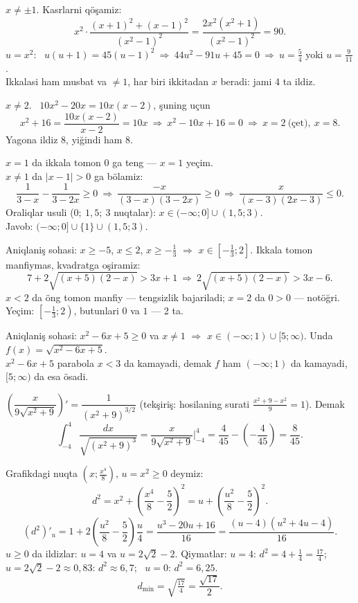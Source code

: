 $x\ne\pm1$. Kasrlarni qöşamiz:
\[x^2\cdot\frac{(x+1)^2+(x-1)^2}{(x^2-1)^2}=\frac{2x^2(x^2+1)}{(x^2-1)^2}=90.\]
$u=x^2$: \ $u(u+1)=45(u-1)^2\ \Rightarrow\ 44u^2-91u+45=0\ \Rightarrow\ u=\frac54$ yoki $u=\frac9{11}$.\\
Ikkalasi ham musbat va $\ne1$, har biri ikkitadan $x$ beradi: jami 4 ta ildiz.

$x\ne2$. \ $10x^2-20x=10x(x-2)$, şuning uçun
\[x^2+16=\frac{10x(x-2)}{x-2}=10x\ \Rightarrow\ x^2-10x+16=0\ \Rightarrow\ x=2\ \text{(çet)},\ x=8.\]
Yagona ildiz 8, yiğindi ham 8.

$x=1$ da ikkala tomon 0 ga teng — $x=1$ yeçim.\\
$x\ne1$ da $|x-1|>0$ ga bölamiz:
\[\frac1{3-x}-\frac1{3-2x}\ge0\ \Rightarrow\ \frac{-x}{(3-x)(3-2x)}\ge0\ \Rightarrow\ \frac{x}{(x-3)(2x-3)}\le0.\]
Oraliqlar usuli ($0;\ 1{,}5;\ 3$ nuqtalar): $x\in(-\infty;0]\cup(1{,}5;3)$.\\
Javob: $(-\infty;0]\cup\{1\}\cup(1{,}5;3)$.

Aniqlaniş sohasi: $x\ge-5$, $x\le2$, $x\ge-\frac13$ $\Rightarrow$ $x\in\left[-\frac13;2\right]$. Ikkala tomon manfiymas, kvadratga oşiramiz:
\[7+2\sqrt{(x+5)(2-x)}>3x+1\ \Rightarrow\ 2\sqrt{(x+5)(2-x)}>3x-6.\]
$x<2$ da öng tomon manfiy — tengsizlik bajariladi; $x=2$ da $0>0$ — notöğri.\\
Yeçim: $\left[-\frac13;2\right)$, butunlari $0$ va $1$ — 2 ta.

Aniqlaniş sohasi: $x^2-6x+5\ge0$ va $x\ne1$ $\Rightarrow$ $x\in(-\infty;1)\cup[5;\infty)$. Unda $f(x)=\sqrt{x^2-6x+5}$.\\
$x^2-6x+5$ parabola $x<3$ da kamayadi, demak $f$ ham $(-\infty;1)$ da kamayadi, $[5;\infty)$ da esa ösadi.

$\left(\dfrac{x}{9\sqrt{x^2+9}}\right)'=\dfrac{1}{(x^2+9)^{3/2}}$ (tekşiriş: hosilaning surati $\frac{x^2+9-x^2}{9}=1$). Demak
\[\int_{-4}^{4}\frac{dx}{\sqrt{(x^2+9)^3}}=\frac{x}{9\sqrt{x^2+9}}\Big|_{-4}^{4}=\frac{4}{45}-\left(-\frac4{45}\right)=\frac8{45}.\]

Grafikdagi nuqta $\left(x;\frac{x^4}8\right)$, $u=x^2\ge0$ deymiz:
\[d^2=x^2+\left(\frac{x^4}8-\frac52\right)^2=u+\left(\frac{u^2}8-\frac52\right)^2.\]
\[(d^2)'_u=1+2\left(\frac{u^2}8-\frac52\right)\frac u4=\frac{u^3-20u+16}{16}=\frac{(u-4)(u^2+4u-4)}{16}.\]
$u\ge0$ da ildizlar: $u=4$ va $u=2\sqrt2-2$. Qiymatlar: $u=4$: $d^2=4+\frac14=\frac{17}4$; \ $u=2\sqrt2-2\approx0{,}83$: $d^2\approx6{,}7$; \ $u=0$: $d^2=6{,}25$.
\[d_{\min}=\sqrt{\tfrac{17}4}=\frac{\sqrt{17}}2.\]

